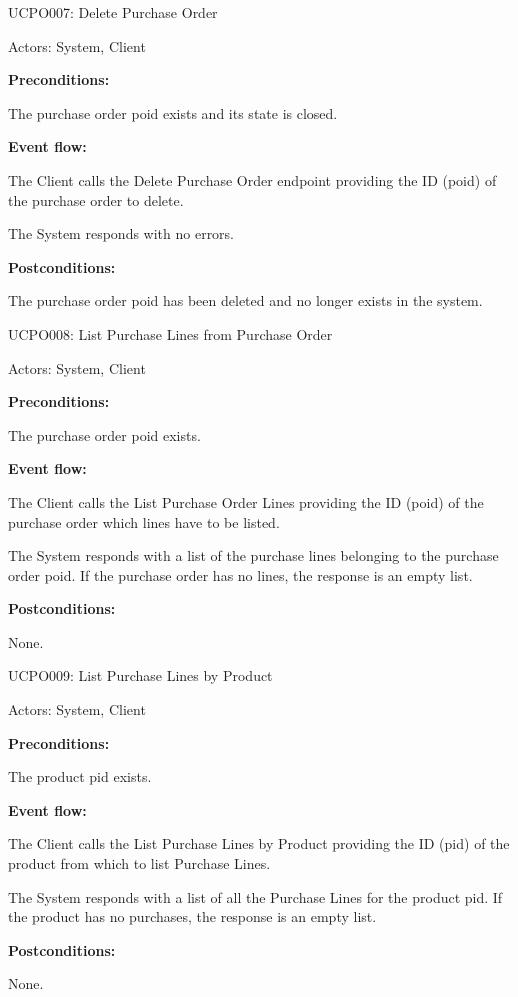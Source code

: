 \begin{ucbox}{UCPO007: Delete Purchase Order}
\label{UCPO007}

Actors: System, Client

\textbf{Preconditions:}

\ucitem The purchase order poid exists and its state is closed.

\textbf{Event flow:}

\ucitem The Client calls the Delete Purchase Order endpoint providing the ID (poid) of the purchase order to delete.

\ucitem The System responds with no errors.

\textbf{Postconditions:}

\ucitem The purchase order poid has been deleted and no longer exists in the system.

\end{ucbox}

\begin{ucbox}{UCPO008: List Purchase Lines from Purchase Order}
\label{UCPO008}

Actors: System, Client

\textbf{Preconditions:}

\ucitem The purchase order poid exists.

\textbf{Event flow:}

\ucitem The Client calls the List Purchase Order Lines providing the ID (poid) of the purchase order which lines have to be listed.

\ucitem The System responds with a list of the purchase lines belonging to the purchase order poid. If the purchase order has no lines, the response is an empty list.

\textbf{Postconditions:}

\ucitem None.

\end{ucbox}

\begin{ucbox}{UCPO009: List Purchase Lines by Product}
\label{UCPO009}

Actors: System, Client

\textbf{Preconditions:}

\ucitem The product pid exists.

\textbf{Event flow:}

\ucitem The Client calls the List Purchase Lines by Product providing the ID (pid) of the product from which to list Purchase Lines.

\ucitem The System responds with a list of all the Purchase Lines for the product pid. If the product has no purchases, the response is an empty list.

\textbf{Postconditions:}

\ucitem None.

\end{ucbox}

